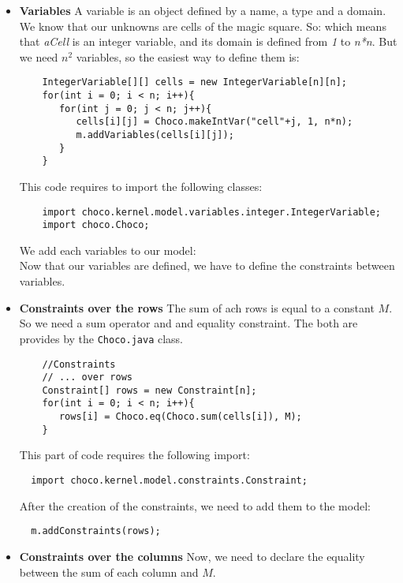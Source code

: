 \begin{itemize}
\item 
\textbf{Variables}\label{gettingstarted:variables}\hypertarget{gettingstarted:variables}{}
A variable is an object defined by a name, a type and a domain. We know that our unknowns are cells of the magic square. So:
which means that \emph{aCell} is an integer variable, and its domain is defined from \emph{1} to \emph{n*n}.
But we need $n^2$ variables, so the easiest way to define them is:
\begin{lstlisting}
	IntegerVariable[][] cells = new IntegerVariable[n][n];
	for(int i = 0; i < n; i++){
	   for(int j = 0; j < n; j++){
	      cells[i][j] = Choco.makeIntVar("cell"+j, 1, n*n); 
	      m.addVariables(cells[i][j]);
	   }
	}
\end{lstlisting}
This code requires to import the following classes:
\begin{lstlisting}
	import choco.kernel.model.variables.integer.IntegerVariable;
	import choco.Choco;
\end{lstlisting}
We add each variables to our model:
\\
Now that our variables are defined, we have to define the constraints between variables.
\item
\textbf{Constraints over the rows}\label{gettingstarted:constraintsovertherows}\hypertarget{gettingstarted:constraintsovertherows}{}
The sum of ach rows is equal to a constant $M$.
So we need a sum operator and and equality constraint. The both are provides by the \texttt{Choco.java} class.
\begin{lstlisting}
	//Constraints
	// ... over rows
	Constraint[] rows = new Constraint[n];
	for(int i = 0; i < n; i++){
	   rows[i] = Choco.eq(Choco.sum(cells[i]), M);
	}
\end{lstlisting}
This part of code requires the following import:
\begin{lstlisting}
  import choco.kernel.model.constraints.Constraint;
\end{lstlisting}
After the creation of the constraints, we need to add them to the model:
\begin{lstlisting}
  m.addConstraints(rows);
\end{lstlisting}
\item
\textbf{Constraints over the columns}\label{gettingstarted:constraintsoverthecolumns}\hypertarget{gettingstarted:constraintsoverthecolumns}{}
Now, we need to declare the equality between the sum of each column and $M$.

\end{itemize}
